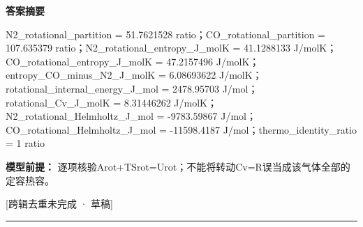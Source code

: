 \documentclass[UTF8,11pt,a4paper]{ctexart}
\begin{document}
\noindent\textbf{答案摘要}\par
N2\_rotational\_partition = 51.7621528 ratio；CO\_rotational\_partition = 107.635379 ratio；N2\_rotational\_entropy\_J\_molK = 41.1288133 J/molK；CO\_rotational\_entropy\_J\_molK = 47.2157496 J/molK；entropy\_CO\_minus\_N2\_J\_molK = 6.08693622 J/molK；rotational\_internal\_energy\_J\_mol = 2478.95703 J/mol；rotational\_Cv\_J\_molK = 8.31446262 J/molK；N2\_rotational\_Helmholtz\_J\_mol = -9783.59867 J/mol；CO\_rotational\_Helmholtz\_J\_mol = -11598.4187 J/mol；thermo\_identity\_ratio = 1 ratio\par
\noindent\textbf{模型前提：}
逐项核验Arot+TSrot=Urot；不能将转动Cv=R误当成该气体全部的定容热容。\par
\noindent\textcolor{red!65!black}{[跨辑去重未完成 · 草稿]} \par
\medskip\hrule\medskip
{}
\end{document}
